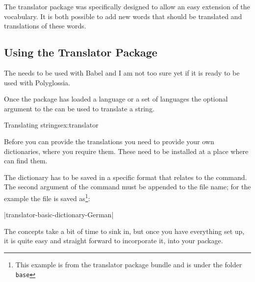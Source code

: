 The translator package was specifically designed to allow an easy
extension of the vocabulary. It is both possible to add new words that
should be translated and translations of these words.

\subsection{Using the Translator Package}

  The  needs to be used with Babel and I am not too sure yet 
  if it is ready  to be used with Polyglossia.

Once the package has loaded a language or a set of languages the optional argument to the
\cmd{\translate} can be used to translate a string. 

\begin{texexample}{Translating strings}{ex:translator}
\end{texexample}

Before you can provide the translations you need to provide your own dictionaries, where you require them. These need to be installed at a place where \tex can find them.

\CMDI{\ProvidesDictionary}


The dictionary has to be saved in a specific format that relates to the \cmd{\ProvidesDictionary} command. The second argument of the command must be appended to the file name; for the example the file is saved as\footnote{This  example is from the translator package bundle and is under the folder \texttt{base}}:

|translator-basic-dictionary-German|

The concepts take a bit of time to sink in, but once you have everything set up, it is quite easy and straight forward to incorporate it, into your package. 

\begin{teXXX}

\end{teXXX} 

